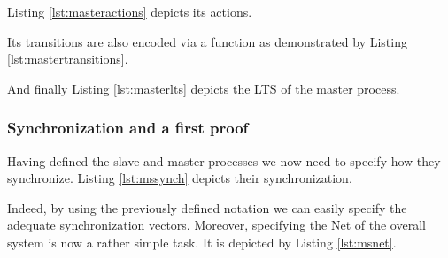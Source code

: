 	\noindent Listing \ref{lst:masteractions} depicts its \textsf{actions}.

		

	\noindent Its transitions are also encoded via a function as demonstrated by 
	Listing \ref{lst:mastertransitions}.
	
				
	
	\noindent And finally Listing \ref{lst:masterlts} depicts the \textsf{LTS} of the master process.
	
	
						
	

	
\subsubsection{Synchronization and a first proof}	
\label{subsub:synch}	
	
	
	Having defined the slave and master processes we now need to specify how they synchronize.
	Listing \ref{lst:mssynch}	depicts their synchronization.	
	
						
	
	\noindent Indeed, by using the previously defined notation we can easily specify
	the adequate synchronization vectors. Moreover, specifying the \textsf{Net} of the
	overall system is now a rather simple task.	
	It is depicted by Listing \ref{lst:msnet}.

				

